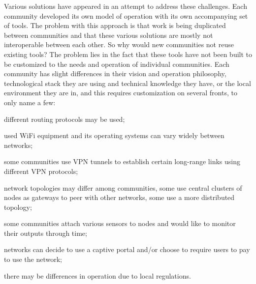 \documentclass[5p,sort&compress]{elsarticle}
\begin{document}
Various solutions have appeared in an attempt to address these challenges. Each community developed its own model of operation with its own accompanying set of tools.
The problem with this approach is that work is being duplicated between communities and that these various solutions are mostly not interoperable between each other.
So why would new communities not reuse existing tools?
The problem lies in the fact that these tools have not been built to be customized to the needs and operation of individual communities.
Each community has slight differences in their vision and operation philosophy, technological stack they are using and technical knowledge they have, or the local environment they are in, and this requires customization on several fronts, to only name a few:
\begin{enumerate*}[label=\itshape\alph*\upshape)]
\item different routing protocols may be used;
\item used WiFi equipment and its operating systems can vary widely between networks;
\item some communities use VPN tunnels to establish certain long-range links using different VPN protocols;
\item network topologies may differ among communities, some use central clusters of nodes as gateways to peer with other networks, some use a more distributed topology;
\item some communities attach various sensors to nodes and would like to monitor their outputs through time;
\item networks can decide to use a captive portal and/or choose to require users to pay to use the network;
\item there may be differences in operation due to local regulations.
\end{enumerate*}
\end{document}
